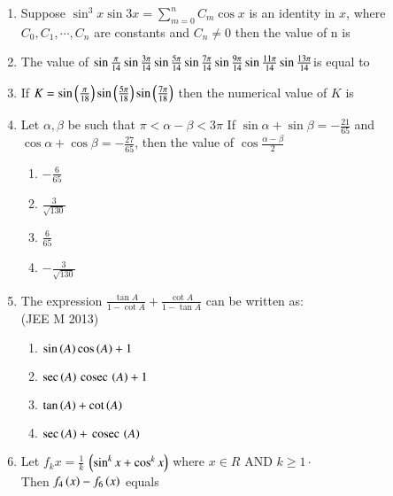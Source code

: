 \begin{enumerate}[label=\thesubsection.\arabic*,ref=\thesubsection.\theenumi]
    \item Suppose $\sin^3{x}\sin3x = \sum_{m=0}^{n} C_m \cos x $ is an identity in $x$, where $C_0, C_1, \cdots , C_n$ are constants and $C_n \neq 0$ then the value of n is
        \hfill{}
    \item The value of
        $\sin\frac{\pi}{14}\sin\frac{3\pi}{14}\sin\frac{5\pi}{14}\sin\frac{7\pi}{14}
        \\ \sin\frac{9\pi}{14}\sin\frac{11\pi}{14}\sin\frac{13\pi}{14} $is equal to  

        \hfill{}



    \item If $K = \sin\left(\frac{\pi}{18}\right)\sin\left(\frac{5\pi}{18}\right)\sin\left(\frac{7\pi}{18}\right)$ then the numerical value of $K$ is  
        \hfill{}

\item Let $\alpha,\beta$ be such that $\pi<\alpha-\beta<3\pi$
If $\sin\alpha+\sin\beta=-\frac{21}{65}$ and $\cos\alpha+\cos\beta=-\frac{27}{65}$, then the value of $\cos\frac{\alpha-\beta}{2}$\hfill{}
\begin{multicols}{2} 
\begin{enumerate}
\item $-\frac{6}{65}$
\item $\frac{3}{\sqrt{130}}$
\columnbreak
\item $\frac{6}{65}$
\item $-\frac{3}{\sqrt{130}}$
\end{enumerate} 
\end{multicols}
\item The expression $\frac{\tan A}{1-\cot A} +\frac{\cot A}{1-\tan A}$ can be written as:\\

\hfill {(JEE M 2013)}\\
    \begin{enumerate}
    \item $\sin\left(A\right)\cos\left(A\right)+1$
    \item $\sec\left(A\right)\,\text{cosec}\,\left(A\right)+1$
    \item $\tan\left(A\right)+\cot\left(A\right)$ 
    \item $\sec\left(A\right)+\,\text{cosec}\,\left(A\right)$
    \end{enumerate}
\item Let $f_{k}x=\frac{1}{k}$ $\left(\sin^{k}x+\cos^{k}x\right)$ where $x\in R$ AND $k\geq 1 \cdot $\\
 Then $f_{4}\left(x\right)-f_{6}\left(x\right)$ equals


\end{enumerate}
